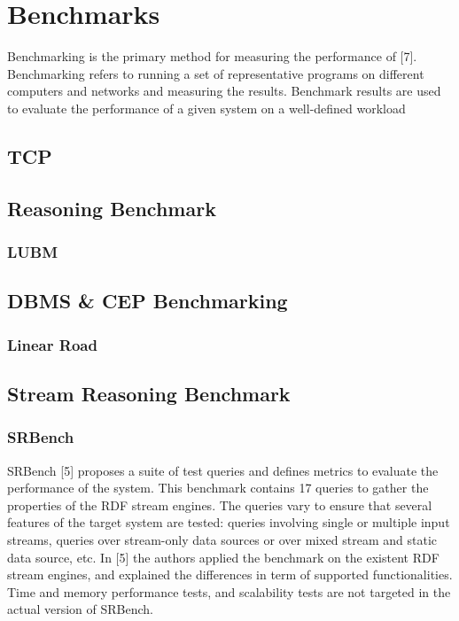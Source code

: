 {\section{Benchmarks}
\cite{Menasce:2001:CPW:560806}
Benchmarking is the primary method for measuring the performance
of  [7]. Benchmarking refers to running a set of
representative programs on different computers and networks and measuring
the results. Benchmark results are used to evaluate the performance of a
given system on a well-defined workload

\subsection{TCP}  \label{sec:tcp}


\subsection{Reasoning Benchmark}
\subsubsection{LUBM}
\subsection{DBMS \& CEP Benchmarking}
\subsubsection{Linear Road}
\subsection{Stream Reasoning Benchmark}
\subsubsection{SRBench}
SRBench [5] proposes a suite of test queries and defines metrics to evaluate the
performance of the system. This benchmark contains 17 queries to gather the
properties of the RDF stream engines. The queries vary to ensure that several
features of the target system are tested: queries involving single or multiple input
streams, queries over stream-only data sources or over mixed stream and static
data source, etc. In [5] the authors applied the benchmark on the existent RDF
stream engines, and explained the differences in term of supported functionalities.
Time and memory performance tests, and scalability tests are not targeted
in the actual version of SRBench.
}
